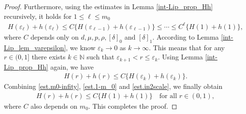 \documentclass[10pt,a4paper]{amsart}
\begin{document}
\begin{proof}
Furthermore, using the estimates in Lemma \ref{int-Lip_prop_Hh} recursively, it holds for $1\leq \ell\leq m_0$
  \begin{align}\label{est.1-m_0}
    H(\varepsilon_{\ell})+h(\varepsilon_{\ell})\leq C\{H(\varepsilon_{\ell-1})+h(\varepsilon_{\ell-1})\}\leq\cdots\leq  C^{\ell}\{H(1)+h(1)\}, 
  \end{align}
  where $C$ depends only on $d, \mu, p, \rho, [\delta]_0$ and $[\delta]_1$. According to Lemma \ref{int-Lip_lem_varepsilon}, we know $\varepsilon_k\rightarrow 0$ as $k\rightarrow\infty$. This means that for any $r\in (0, 1]$ there exists $k\in\mathbb{N}$ such that $\varepsilon_{k+1}<r\leq \varepsilon_k$. Using Lemma \ref{int-Lip_prop_Hh} again, we have
  \begin{align}\label{est.in2scale}
    H(r)+h(r)\leq C\{H(\varepsilon_k)+h(\varepsilon_k)\}. 
  \end{align}
Combining \eqref{est.m0-infity}, \eqref{est.1-m_0} and \eqref{est.in2scale}, we finally obtain
  \begin{align*}
    H(r)+h(r)\leq C\{H(1)+h(1)\}\quad\text{for all } r\in (0,1), 
  \end{align*}
  where $C$ also depends on $m_0$. This completes the proof.
\end{proof}
\end{document}
